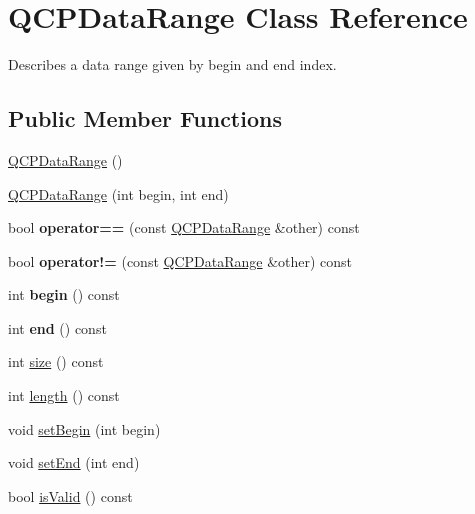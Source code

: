 \hypertarget{classQCPDataRange}{}\section{Q\+C\+P\+Data\+Range Class Reference}
\label{classQCPDataRange}


Describes a data range given by begin and end index.  


\subsection*{Public Member Functions}
\begin{DoxyCompactItemize}
\item 
\hyperlink{classQCPDataRange_a49e72fd9bace1da9d875136dcc04c986}{Q\+C\+P\+Data\+Range} ()
\item 
\hyperlink{classQCPDataRange_a6c7f4a3684210423270515403060e9cf}{Q\+C\+P\+Data\+Range} (int begin, int end)
\item 
\mbox{\label{classQCPDataRange_a8bfd79a282f6ebd766d60caa683242d3}} 
bool {\bfseries operator==} (const \hyperlink{classQCPDataRange}{Q\+C\+P\+Data\+Range} \&other) const
\item 
\mbox{\label{classQCPDataRange_a5bcc9597731a7455407853ed0585f6ab}} 
bool {\bfseries operator!=} (const \hyperlink{classQCPDataRange}{Q\+C\+P\+Data\+Range} \&other) const
\item 
\mbox{\label{classQCPDataRange_ae76d7eba9defdfafcd0fc41096793129}} 
int {\bfseries begin} () const
\item 
\mbox{\label{classQCPDataRange_aee1b20fb045929c3753ee2ce14af7630}} 
int {\bfseries end} () const
\item 
int \hyperlink{classQCPDataRange_ac6af055e509d1b691c244954ff1c5887}{size} () const
\item 
int \hyperlink{classQCPDataRange_a1e7836058f755c6ab9f11996477b7150}{length} () const
\item 
void \hyperlink{classQCPDataRange_a54ff59048e01e46ac4aefafc844626c6}{set\+Begin} (int begin)
\item 
void \hyperlink{classQCPDataRange_a277f1a9eafe70b9184d9c00b641ae5de}{set\+End} (int end)
\item 
bool \hyperlink{classQCPDataRange_aae53a37472212dca0a7939963e20dba0}{is\+Valid} () const

\end{DoxyCompactItemize}
